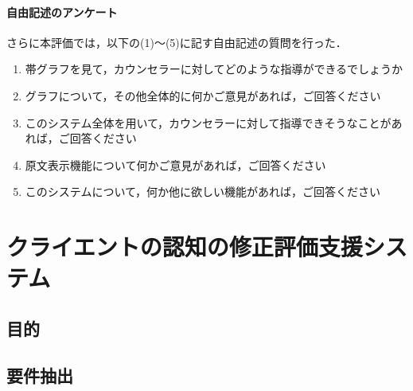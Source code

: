 \documentclass[shuuron]{kuee}
\begin{document}
\subsubsection{自由記述のアンケート}


さらに本評価では，以下の(1)～(5)に記す自由記述の質問を行った．



\begin{enumerate}
 \item 帯グラフを見て，カウンセラーに対してどのような指導ができるでしょうか
 \item グラフについて，その他全体的に何かご意見があれば，ご回答ください
 \item このシステム全体を用いて，カウンセラーに対して指導できそうなことがあれば，ご回答ください
 \item 原文表示機能について何かご意見があれば，ご回答ください
 \item このシステムについて，何か他に欲しい機能があれば，ご回答ください
\end{enumerate}









\chapter{クライエントの認知の修正評価支援システム}
	\section{目的}


\section{要件抽出}

%
\end{document}
